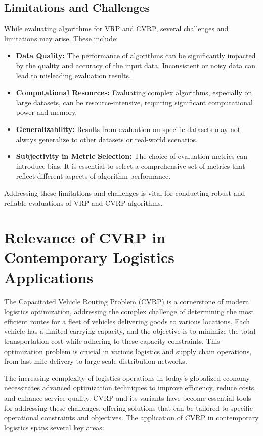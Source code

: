 \documentclass{article}
\begin{document}
    \subsection{Limitations and Challenges}\label{subsec:limitations-and-challenges}
    While evaluating algorithms for VRP and CVRP, several challenges and limitations may arise. These include:
    \begin{itemize}
        \item \textbf{Data Quality:} The performance of algorithms can be significantly impacted by the quality and accuracy of the input data. Inconsistent or noisy data can lead to misleading evaluation results.
        \item \textbf{Computational Resources:} Evaluating complex algorithms, especially on large datasets, can be resource-intensive, requiring significant computational power and memory.
        \item \textbf{Generalizability:} Results from evaluation on specific datasets may not always generalize to other datasets or real-world scenarios.
        \item \textbf{Subjectivity in Metric Selection:} The choice of evaluation metrics can introduce bias. It is essential to select a comprehensive set of metrics that reflect different aspects of algorithm performance.
    \end{itemize}
    Addressing these limitations and challenges is vital for conducting robust and reliable evaluations of VRP and CVRP algorithms. \cite{toth2014vehicle}

    \newpage


    \section{Relevance of CVRP in Contemporary Logistics Applications}\label{sec:relevance-of-cvrp-in-contemporary-logistics-applications}

    The Capacitated Vehicle Routing Problem (CVRP) is a cornerstone of modern logistics optimization, addressing the complex challenge of determining the most efficient routes for a fleet of vehicles delivering goods to various locations. Each vehicle has a limited carrying capacity, and the objective is to minimize the total transportation cost while adhering to these capacity constraints. This optimization problem is crucial in various logistics and supply chain operations, from last-mile delivery to large-scale distribution networks.

    The increasing complexity of logistics operations in today's globalized economy necessitates advanced optimization techniques to improve efficiency, reduce costs, and enhance service quality. CVRP and its variants have become essential tools for addressing these challenges, offering solutions that can be tailored to specific operational constraints and objectives. The application of CVRP in contemporary logistics spans several key areas:
\end{document}
